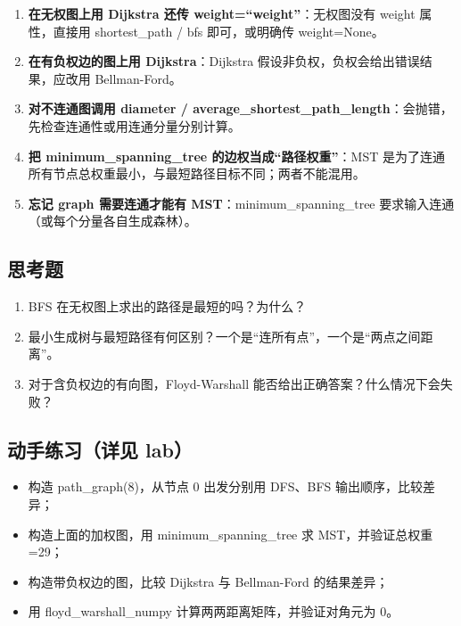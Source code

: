 \begin{enumerate}
\def\labelenumi{\arabic{enumi}.}
\tightlist
\item
  \textbf{在无权图上用 Dijkstra 还传 weight=``weight''}：无权图没有
  weight 属性，直接用 shortest\_path / bfs 即可，或明确传 weight=None。
\item
  \textbf{在有负权边的图上用 Dijkstra}：Dijkstra
  假设非负权，负权会给出错误结果，应改用 Bellman-Ford。
\item
  \textbf{对不连通图调用 diameter /
  average\_shortest\_path\_length}：会抛错，先检查连通性或用连通分量分别计算。
\item
  \textbf{把 minimum\_spanning\_tree 的边权当成``路径权重''}：MST
  是为了连通所有节点总权重最小，与最短路径目标不同；两者不能混用。
\item
  \textbf{忘记 graph 需要连通才能有 MST}：minimum\_spanning\_tree
  要求输入连通（或每个分量各自生成森林）。
\end{enumerate}

\subsection{思考题}\label{ux601dux8003ux9898-21}

\begin{enumerate}
\def\labelenumi{\arabic{enumi}.}
\tightlist
\item
  BFS 在无权图上求出的路径是最短的吗？为什么？
\item
  最小生成树与最短路径有何区别？一个是``连所有点''，一个是``两点之间距离''。
\item
  对于含负权边的有向图，Floyd-Warshall
  能否给出正确答案？什么情况下会失败？
\end{enumerate}

\subsection{动手练习（详见
lab）}\label{ux52a8ux624bux7ec3ux4e60ux8be6ux89c1-lab-13}

\begin{itemize}
\tightlist
\item
  构造 path\_graph(8)，从节点 0 出发分别用 DFS、BFS 输出顺序，比较差异；
\item
  构造上面的加权图，用 minimum\_spanning\_tree 求 MST，并验证总权重=29；
\item
  构造带负权边的图，比较 Dijkstra 与 Bellman-Ford 的结果差异；
\item
  用 floyd\_warshall\_numpy 计算两两距离矩阵，并验证对角元为 0。
\end{itemize}

